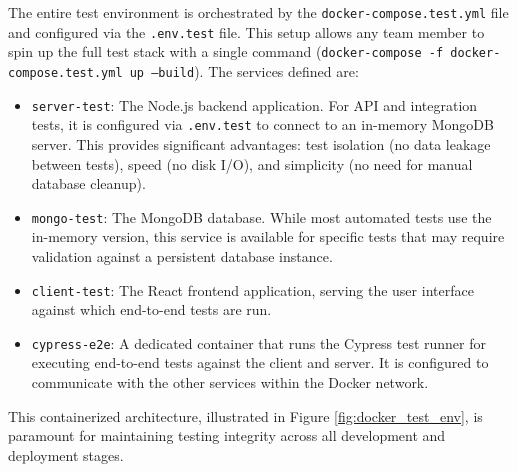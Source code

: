 The entire test environment is orchestrated by the \texttt{docker-compose.test.yml} file and configured via the \texttt{.env.test} file. This setup allows any team member to spin up the full test stack with a single command (\texttt{docker-compose -f docker-compose.test.yml up --build}). The services defined are:
\begin{itemize}[noitemsep]
    \item \texttt{server-test}: The Node.js backend application. For API and integration tests, it is configured via \texttt{.env.test} to connect to an in-memory MongoDB server. This provides significant advantages: test isolation (no data leakage between tests), speed (no disk I/O), and simplicity (no need for manual database cleanup).
    \item \texttt{mongo-test}: The MongoDB database. While most automated tests use the in-memory version, this service is available for specific tests that may require validation against a persistent database instance.
    \item \texttt{client-test}: The React frontend application, serving the user interface against which end-to-end tests are run.
    \item \texttt{cypress-e2e}: A dedicated container that runs the Cypress test runner for executing end-to-end tests against the client and server. It is configured to communicate with the other services within the Docker network.
\end{itemize}

This containerized architecture, illustrated in Figure \ref{fig:docker_test_env}, is paramount for maintaining testing integrity across all development and deployment stages.

